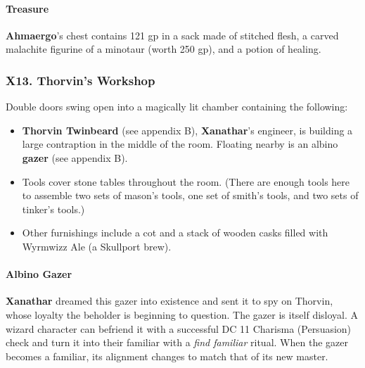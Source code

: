 \documentclass[10pt,a4paper,twoside,twocolumn,openany,nodeprecatedcode]{dndbook}
\begin{document}
\paragraph{Treasure}
\textbf{Ahmaergo}'s chest contains 121 gp in a sack made of stitched flesh, a carved malachite figurine of a minotaur (worth 250 gp), and a potion of healing.
\subsubsection{X13. Thorvin's Workshop}
Double doors swing open into a magically lit chamber containing the following:
\begin{itemize}

\item \textbf{Thorvin Twinbeard} (see appendix B), \textbf{Xanathar}'s engineer, is building a large contraption in the middle of the room. Floating nearby is an albino \textbf{gazer} (see appendix B).
\item Tools cover stone tables throughout the room. (There are enough tools here to assemble two sets of mason's tools, one set of smith's tools, and two sets of tinker's tools.)
\item Other furnishings include a cot and a stack of wooden casks filled with Wyrmwizz Ale (a Skullport brew).
\end{itemize}


\paragraph{Albino Gazer}
\textbf{Xanathar} dreamed this gazer into existence and sent it to spy on Thorvin, whose loyalty the beholder is beginning to question. The gazer is itself disloyal. A wizard character can befriend it with a successful DC 11 Charisma (Persuasion) check and turn it into their familiar with a \textit{find familiar} ritual. When the gazer becomes a familiar, its alignment changes to match that of its new master.
\end{document}
